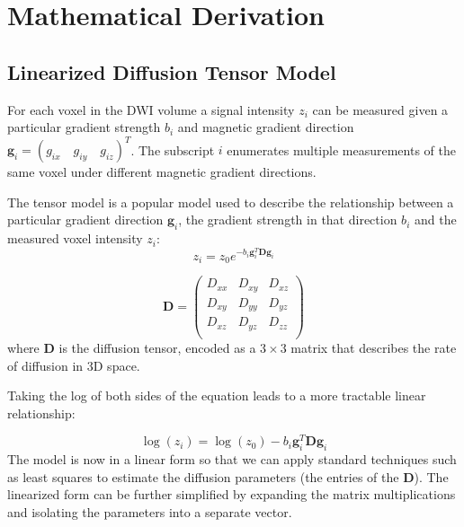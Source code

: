 \chapter{Mathematical Derivation}
\section{Linearized Diffusion Tensor Model}
For each voxel in the DWI volume a signal intensity $z_i$ can be measured given a particular gradient strength $b_i$ and magnetic gradient direction $\mathbf{g}_{i}=(g_{ix} \quad g_{iy} \quad g_{iz})^T$.  The subscript $i$ enumerates multiple measurements of the same voxel under different magnetic gradient directions.

The tensor model is a popular model used to describe the relationship between a particular gradient direction $\mathbf{g}_i$, the gradient strength in that direction $b_i$ and the measured voxel intensity $z_i$:  
%
%
\begin{equation} \label{eq:tensormodel}
z_{i}=z_0 e^{-b_i \mathbf{g}_i^T \mathbf{D} \mathbf{g}_i}
\end{equation}


\begin{equation} \label{eq:Dtensor}
\mathbf{D}=
\left( \begin{array}{ccc}
D_{xx} & D_{xy} & D_{xz} \\
D_{xy} & D_{yy} & D_{yz} \\
D_{xz} & D_{yz} & D_{zz} \\
\end{array} \right)
\end{equation}
%
%
where $\mathbf{D}$ is the diffusion tensor, encoded as a $3\times3$ matrix that describes the rate of diffusion in 3D space.  


Taking the log of both sides of the equation leads to a more tractable linear relationship:

\begin{equation} \label{eq:logtensormodel}
\log(z_i)=\log(z_0)-b_i \mathbf{g}_i^T \mathbf{D} \mathbf{g}_i
\end{equation}
%
%
The model is now in a linear form so that we can apply standard techniques such as least squares to estimate the diffusion parameters (the entries of the $\mathbf{D}$).  The linearized form can be further simplified by expanding the matrix multiplications and isolating the parameters into a separate vector.

